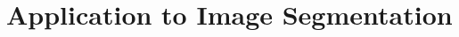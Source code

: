 \documentclass{article}
\newcommand{\bp}{\boldsymbol{p}}
\newcommand{\bq}{\boldsymbol{q}}
\newtheorem{pos}{Postulate}
\begin{document}

\section{Application to Image Segmentation}\label{image_segment}
\end{document}
